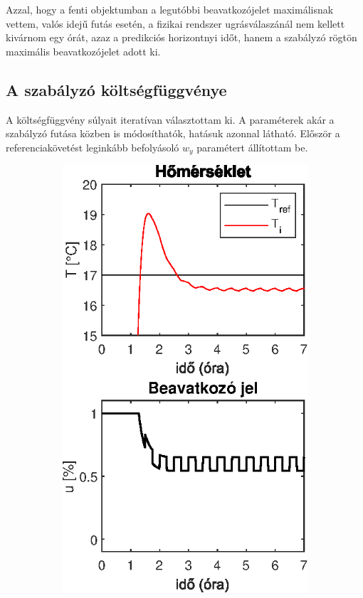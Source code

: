 Azzal, hogy a fenti objektumban a legutóbbi beavatkozójelet maximálisnak vettem, valós idejű futás esetén, a fizikai rendszer ugrásválaszánál nem kellett kivárnom egy órát, azaz a predikciós horizontnyi időt, hanem a szabályzó rögtön maximális beavatkozójelet adott ki.

\subsection{A szabályzó költségfüggvénye}

A költségfüggvény súlyait iteratívan választottam ki. A paraméterek akár a szabályzó futása közben is módosíthatók, hatásuk azonnal látható. Először a referenciakövetést leginkább befolyásoló $w_y$ paramétert állítottam be. 

\begin{figure}[H]
	\begin{subfigure}[t]{0.32\textwidth}
		\centering
		\includegraphics[width=\textwidth]{figures/realsys/mpc-wy-1}

\end{subfigure}
\end{figure}
